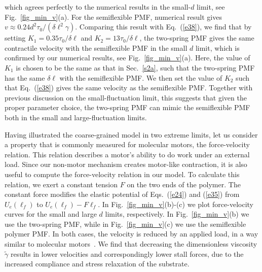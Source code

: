 \documentclass[twocolumn,prl,english]{revtex4-1}
\begin{document}
which agrees perfectly to the numerical results in the small-$d$ limit, see Fig.~\ref{fig_min_v}(a). For the semiflexible PMF, numerical result gives $v\approx0.24d^2\tau_0/(\delta\ell^2\gamma)$. Comparing this result with Eq.~(\ref{e38}), we find that by setting $K_1 = 0.35\tau_0/\delta\ell$ and $K_2 = 13\tau_0/\delta\ell$, the two-spring PMF gives the same contractile velocity with the semiflexible PMF in the small $d$ limit, which is confirmed by our numerical results, see Fig.~\ref{fig_min_v}(a). Here, the value of $K_1$ is chosen to be the same as that in Sec.~\ref{s2a}, such that the two-spring PMF has the same $\delta \ell$ with the semiflexible PMF. We then set the value of $K_2$ such that Eq.~(\ref{e38}) gives the same velocity as the semiflexible PMF. Together with previous discussion on the small-fluctuation limit, this suggests that given the proper parameter choice, the two-spring PMF can mimic the semiflexible PMF both in the small and large-fluctuation limits.

Having illustrated the coarse-grained model in two extreme limits, let us consider a property that is commonly measured for molecular motors, the force-velocity relation. This relation describes a motor's ability to do work under an external load. Since our non-motor mechanism creates motor-like contraction, it is also useful to compute the force-velocity relation in our model. To calculate this relation, we exert a constant tension $F$ on the two ends of the polymer. The constant force modifies the elastic potential of Eqs.~(\ref{e24}) and (\ref{e35})  from $U_e(\ell_f)$ to $U_e(\ell_f)-F\ell_f$. In Fig.~\ref{fig_min_v}(b)-(c) we plot force-velocity curves for the small and large $d$ limits, respectively. 
In Fig.~\ref{fig_min_v}(b) we use the two-spring PMF, while in Fig.~\ref{fig_min_v}(c) we use the semiflexible polymer PMF. 
In both cases, the velocity is reduced by an applied load, in a way similar to molecular motors~\cite{Derenyi19966775}. 
We find that decreasing the dimensionless viscosity $\tilde \gamma$ results in lower velocities and correspondingly lower stall forces,
 due to the increased compliance and stress relaxation of the substrate. 
 
\end{document}
